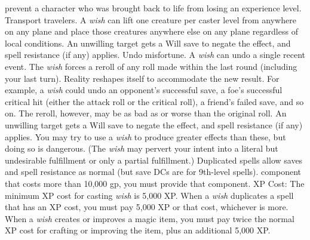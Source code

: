 prevent a character who was brought back to life from losing an experience level.%
Transport travelers. A \textit{wish} can lift one creature per caster level from
anywhere on any plane and place those creatures anywhere else on any plane regardless
of local conditions. An unwilling target gets a Will save to negate the effect,
and spell resistance (if any) applies.%
Undo misfortune. A \textit{wish} can undo a single recent event. The \textit{wish
}forces a reroll of any roll made within the last round (including your last turn).
Reality reshapes itself to accommodate the new result. For example, a \textit{wish
}could undo an opponent's successful save, a foe's successful critical hit (either
the attack roll or the critical roll), a friend's failed save, and so on. The reroll,
however, may be as bad as or worse than the original roll. An unwilling target
gets a Will save to negate the effect, and spell resistance (if any) applies.
You may try to use a \textit{wish} to produce greater effects than these, but doing
so is dangerous. (The \textit{wish} may pervert your intent into a literal but
undesirable fulfillment or only a partial fulfillment.)
Duplicated spells allow saves and spell resistance as normal (but save DCs are
for 9th-level spells).
component that costs more than 10,000 gp, you must provide that component.
XP Cost: The minimum XP cost for casting \textit{wish} is 5,000 XP. When
a \textit{wish} duplicates a spell that has an XP cost, you must pay 5,000 XP or
that cost, whichever is more. When a \textit{wish} creates or improves a magic
item, you must pay twice the normal XP cost for crafting or improving the item,
plus an additional 5,000 XP.